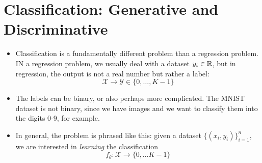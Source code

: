 \section{Classification: Generative and Discriminative}
\begin{itemize}
	\item Classification is a fundamentally different problem than a regression
		problem. IN a regression problem, we usually deal with a dataset \( y_i \in
		\mathbb R \), but in regression, the output is not a real number but rather a label:
		\[
			\mathcal{X} \to \mathcal{Y} \in \{0, \dots, K - 1\}
		\]
	\item The labels can be binary, or also perhaps more complicated. The MNIST
		dataset is not binary, since we have images and we want to classify them into
		the digits 0-9, for example. 
	\item In general, the problem is phrased like this: given a dataset \( \{(x_i,
		y_i)\}_{i = 1}^{n} \), we are interested in \textit{learning} the
		classification 
		\[
			f_{\theta}: \mathcal{X} \to \{0, \dots K - 1\}
		\]
\end{itemize}
